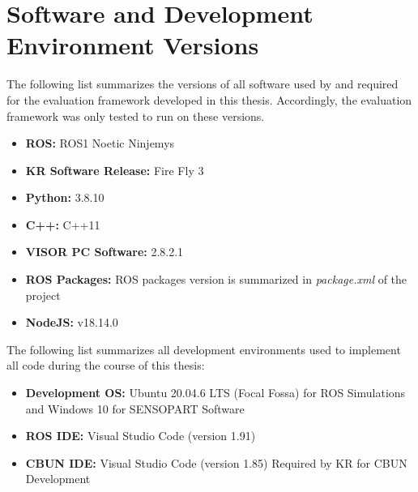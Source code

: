 \section{Software and Development Environment Versions}

The following list summarizes the versions of all software used by and required for the
evaluation framework developed in this thesis. Accordingly, the evaluation framework
was only tested to run on these versions.

\begin{itemize}
    \item \textbf{ROS:} ROS1 Noetic Ninjemys
    \item \textbf{KR Software Release:} Fire Fly 3
    \item \textbf{Python:} 3.8.10
    \item \textbf{C++:} C++11
    \item \textbf{VISOR PC Software:} 2.8.2.1
    \item \textbf{ROS Packages:} ROS packages version is summarized in \textit{package.xml} of the project
    \item \textbf{NodeJS:} v18.14.0
\end{itemize}

The following list summarizes all development environments used to implement all code
during the course of this thesis:

\begin{itemize}
    \item \textbf{Development OS:} Ubuntu 20.04.6 LTS (Focal Fossa) for ROS Simulations and Windows 10 for SENSOPART Software
    \item \textbf{ROS IDE:} Visual Studio Code (version 1.91)
    \item \textbf{CBUN IDE:} Visual Studio Code (version 1.85) Required by KR for CBUN Development
\end{itemize}

\newpage